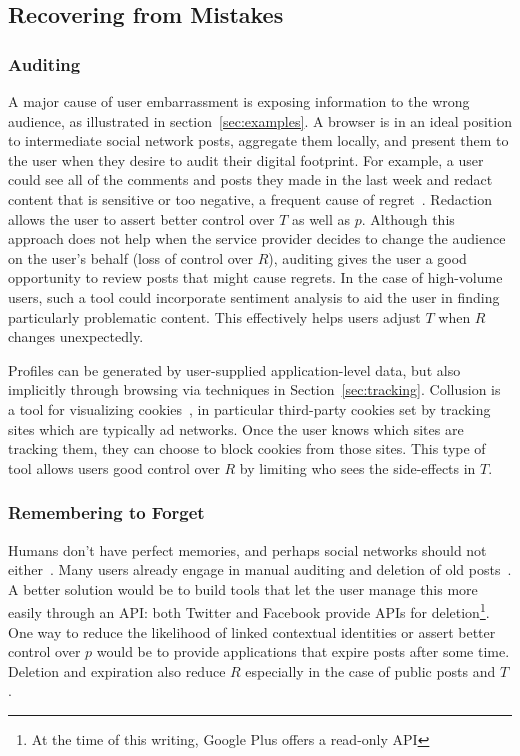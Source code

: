 \documentclass{llncs}
\begin{document}
\subsection{Recovering from Mistakes}
\subsubsection{Auditing}
A major cause of user embarrassment is exposing information to the wrong
audience, as illustrated in section~\ref{sec:examples}. A browser is in an
ideal position to intermediate social network posts, aggregate them locally,
and present them to the user when they desire to audit their digital footprint.
For example, a user could see all of the comments and posts they made in the
last week and redact content that is sensitive or too negative, a frequent cause
of regret~\cite{wang}.  Redaction allows the user to assert
better control over $T$ as well as $p$. Although this approach does not help when the service
provider decides to change the audience on the user's behalf (loss of control
over $R$), auditing gives the user a good opportunity to review posts that
might cause regrets. In the case of high-volume users, such a tool could
incorporate sentiment analysis to aid the user in finding particularly
problematic content.  This effectively helps users adjust $T$ when $R$ changes
unexpectedly.

Profiles can be generated by user-supplied application-level data, but also
implicitly through browsing via techniques in Section~\ref{sec:tracking}. Collusion is a
tool for visualizing cookies~\cite{collusion}, in particular third-party
cookies set by tracking sites which are typically ad networks.  Once the user
knows which sites are tracking them, they can choose to block cookies from
those sites.  This type of tool allows users good control over $R$ by limiting
who sees the side-effects in $T$.

\subsubsection{Remembering to Forget}
Humans don't have perfect memories, and perhaps social
networks should not either~\cite{delete}. Many users already engage in manual auditing and
deletion of old posts~\cite{fbtips2}. A better solution would be to build tools
that let the user manage this more easily through an API: both Twitter and Facebook provide
APIs for deletion\footnote{At the time of this writing, Google Plus offers a
read-only API}. One way to reduce the likelihood of linked contextual
identities or assert better control over $p$ would be to provide applications that expire posts after some time.
Deletion and expiration also reduce $R$ especially in the case of public posts
and $T$.
\end{document}
